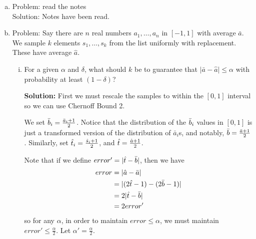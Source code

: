 \begin{enumerate}[(a)]
    \item Problem: read the notes \\
        Solution: Notes have been read.
    \item Problem: Say there are $n$ real numbers $a_1, \ldots, a_n$ in $[-1,1]$ with average $\bar{a}$.  We sample $k$
        elements $s_1, \ldots, s_k$ from the list uniformly with replacement.  These have average $\hat{a}$.  
        \begin{enumerate}[(i)]
            \item For a given $\alpha$ and $\delta$, what should $k$ be to guarantee that $\vert \bar{a} - \hat{a} \vert \le \alpha$
                with probability at least $(1-\delta)$? 

                \textbf{Solution:} First we must rescale the samples to within the $[0,1]$ interval so we can use Chernoff Bound 2.

                We set $\bar{b}_i = \frac{\bar{a}_i + 1}{2}$.  Notice that the distribution of the $\bar{b}_i$ values in
                $[0,1]$ is just a transformed version of the distribution of $\bar{a}_i$s, and notably, $\bar{b} =
                \frac{\bar{a}+1}{2}$.  Similarly, set $\hat{t}_i = \frac{\hat{s}_i + 1}{2}$, and $\hat{t} = \frac{\hat{a}
                + 1}{2}$.

                Note that if we define $error' = \vert \hat{t} - \bar{b} \vert$, then we have
                \begin{align*}
                    error &= \vert \hat{a} - \bar{a} \vert \\
                        &= \vert (2\hat{t} - 1) - (2\bar{b} - 1) \vert \\
                        &= 2\vert \hat{t} - \bar{b} \vert \\
                        &= 2error'
                \end{align*}
                so for any $\alpha$, in order to maintain $error \le \alpha$, we must maintain $error' \le
                \frac{\alpha}{2}$.  Let $\alpha' = \frac{\alpha}{2}$.


\end{enumerate}
\end{enumerate}
